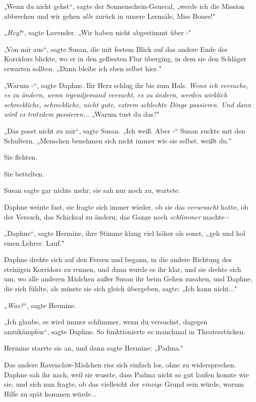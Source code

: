 {„Wenn du nicht gehst“, sagte der Sonnenschein-General, „werde ich die Mission abbrechen und wir gehen \emph{alle} zurück in unsere Lernsäle, Miss Bones!"

„\emph{Hey!}“, sagte Lavender. „Wir haben nicht abgestimmt über -"

„Von mir aus“, sagte Susan, die mit festem Blick auf das andere Ende des Korridors blickte, wo er in den gefliesten Flur überging, in dem sie den Schläger erwarten sollten. „Dann bleibe ich eben selbst hier."

„Warum -“, sagte Daphne. Ihr Herz schlug ihr bis zum Hals. \emph{Wenn ich versuche, es zu ändern, wenn irgendjemand versucht, es zu ändern, werden wirklich schreckliche, schreckliche, nicht gute, extrem schlechte Dinge passieren. Und dann wird es} \emph{trotzdem} \emph{passieren...} „Warum tust du das?"

„Das passt nicht zu mir“, sagte Susan. „Ich weiß. Aber -“ Susan zuckte mit den Schultern. „Menschen benehmen sich nicht immer wie sie selbst, weißt du."

Sie flehten.

Sie bettelten.

Susan sagte gar nichts mehr, sie sah nur noch zu, wartete.

Daphne weinte fast, sie fragte sich immer wieder, ob sie das \emph{verursacht} hatte, ob der Versuch, das Schicksal zu ändern, das Ganze noch \emph{schlimmer} machte -

„Daphne“, sagte Hermine, ihre Stimme klang viel höher als sonst, „geh und hol einen Lehrer. Lauf."

Daphne drehte sich auf den Fersen und begann, in die andere Richtung des steinigen Korridors zu rennen, und dann wurde es ihr klar, und sie drehte sich um, wo alle anderen Mädchen außer Susan ihr beim Gehen zusahen, und Daphne, die sich fühlte, als müsste sie sich gleich übergeben, sagte: „Ich kann nicht..."

„\emph{Was?}“, sagte Hermine.

„Ich glaube, es wird immer schlimmer, wenn du versuchst, dagegen anzukämpfen“, sagte Daphne. So funktionierte es manchmal in Theaterstücken.

Hermine starrte sie an, und dann sagte Hermine: „Padma."

Das andere Ravenclaw-Mädchen riss sich einfach los, ohne zu widersprechen. Daphne sah ihr nach, weil sie wusste, dass Padma nicht so gut laufen konnte wie sie, und sich nun fragte, ob das vielleicht der \emph{einzige} Grund sein würde, warum Hilfe zu spät kommen würde...

}
